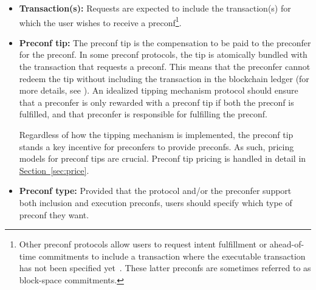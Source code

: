 \documentclass[a4paper]{article}
\theoremstyle{boldstyle}
\begin{document}
    

    \begin{itemize}
        \item \textbf{Transaction(s):} Requests are expected to include the transaction(s) for which the user wishes to receive a preconf\footnote{Other preconf protocols allow users to request intent fulfillment \cite{W:Intent-BasedArchitectureandTheirRisks} or ahead-of-time commitments to include a transaction where the executable transaction has not been specified yet~\cite{W:Proposer-CommitmentInfrastructureinEthereum,W:OpportunitiesandConsiderationsofEthereumsBlockspaceFuture, W:BlockspaceFutures}. These latter preconfs are sometimes referred to as block-space commitments.}. 
        \item \textbf{Preconf tip:} The preconf tip is the compensation to be paid to the preconfer for the preconf. In some preconf protocols, the tip is atomically bundled with the transaction that requests a preconf. This means that the preconfer cannot redeem the tip without including the transaction in the blockchain ledger (for more details, see \cite{W:TheDerivationPipeline,W:AnalyzingBFTProposer-PromisedPreconfirmations}). An idealized tipping mechanism protocol should ensure that a preconfer is only rewarded with a preconf tip if both the preconf is fulfilled, and that preconfer is responsible for fulfilling the preconf. 
        
        Regardless of how the tipping mechanism is implemented, the preconf tip stands a key incentive for preconfers to provide preconfs. As such, pricing models for preconf tips are crucial. Preconf tip pricing is handled in detail in \hyperref[sec:price]{Section~\ref{sec:price}}.
       
        
        \item \textbf{Preconf type:} 
        Provided that the protocol and/or the preconfer support both inclusion and execution preconfs, users should specify which type of preconf they want.
    \end{itemize}
\end{document}
